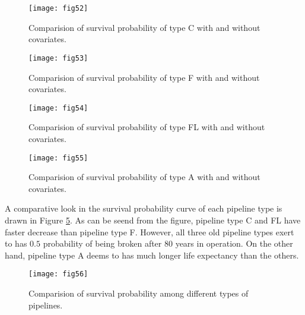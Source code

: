 \documentclass[a4paper,oneside,onecolumn,preprint,10pt,authoryear]{elsarticle}
\begin{document}
\begin{figure}
\begin{center}
\texttt{[image: fig52]} 
\end{center}
\caption{Comparision of survival probability of type C with and without covariates.}
\label{fig52} 
\end{figure}
%
\begin{figure}
\begin{center}
\texttt{[image: fig53]} 
\end{center}
\caption{Comparision of survival probability of type F with and without covariates.}
\label{fig53} 
\end{figure}
%
\begin{figure}
\begin{center}
\texttt{[image: fig54]} 
\end{center}
\caption{Comparision of survival probability of type FL with and without covariates.}
\label{fig54} 
\end{figure}
%
\begin{figure}
\begin{center}
\texttt{[image: fig55]} 
\end{center}
\caption{Comparision of survival probability of type A with and without covariates.}
\label{fig55} 
\end{figure}
A comparative look in the survival probability curve of each pipeline type is drawn in Figure \ref{fig56}. As can be seend from the figure, pipeline type C and FL have faster decrease than pipeline type F. However, all three old pipeline types exert to has $0.5$ probability of being broken after 80 years in operation. On the other hand, pipeline type A deems to has much longer life expectancy than the others.
\begin{figure}
\begin{center}
\texttt{[image: fig56]} 
\end{center}
\caption{Comparision of survival probability among different types of pipelines.}
\label{fig56} 
\end{figure}
%
%
\end{document}
